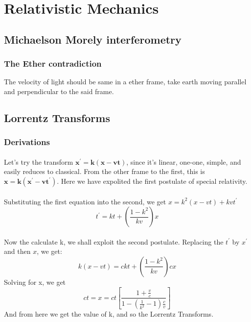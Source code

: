 \section{Relativistic Mechanics}


\subsection{Michaelson Morely interferometry}

\subsubsection{The Ether contradiction}

The velocity of light should be same in a ether frame, take earth moving parallel and perpendicular to the said frame.


\subsection{Lorrentz Transforms}

\subsubsection{Derivations}

\paragraph{} Let's try the transform $ \boldsymbol{x^\prime = k(x - vt)} $, since it's linear, one-one, simple, and easily reduces to classical. From the other frame to the first, this is $ \boldsymbol{x = k(x^\prime - vt^\prime)} $. Here we have expolited the first postulate of special relativity.

\paragraph{} Substituting the first equation into the second, we get $ x = k^2(x - vt) + kvt^\prime $
\begin{equation}
    t^\prime = kt + (\frac{1 - k^2}{kv})x
\end{equation}

\paragraph{} Now the calculate k, we shall exploit the second postulate. Replacing the $t^\prime$ by $ x^\prime$ and then $ x $, we get:
\begin{equation*}
    k (x - vt)  = ckt + (\frac{1-k^2}{kv}) cx
\end{equation*}
Solving for x, we get
\begin{equation*}
    ct = x = ct [\frac{1 + \frac{v}{c}}{1 - (\frac{1}{k^2} - 1) \frac{c}{v}}]
\end{equation*}
And from here we get the value of k, and so the Lorrentz Transforms.

